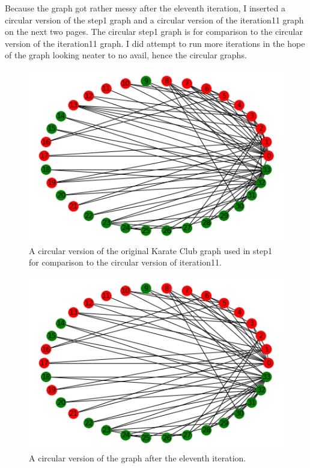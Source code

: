 \documentclass[12pt]{article}
\begin{document}
Because the graph got rather messy after the eleventh iteration, I inserted a circular version of the step1 graph and a circular version of the iteration11 graph on the next two pages.  The circular step1 graph is for comparison to the circular version of the iteration11 graph.  I did attempt to run more iterations in the hope of the graph looking neater to no avail, hence the circular graphs.

\pagebreak

\begin{figure}[h]
    \centering
    \includegraphics{circularStep1.png}
    \caption{A circular version of the original Karate Club graph used in step1 for comparison to the circular version of iteration11.}
    \label{fig:circStep1}
\end{figure}

\pagebreak

\begin{figure}[h]
    \centering
    \includegraphics{circularIteration11.png}
    \caption{A circular version of the graph after the eleventh iteration.}
    \label{fig:circIteration11}
\end{figure}
\end{document}
